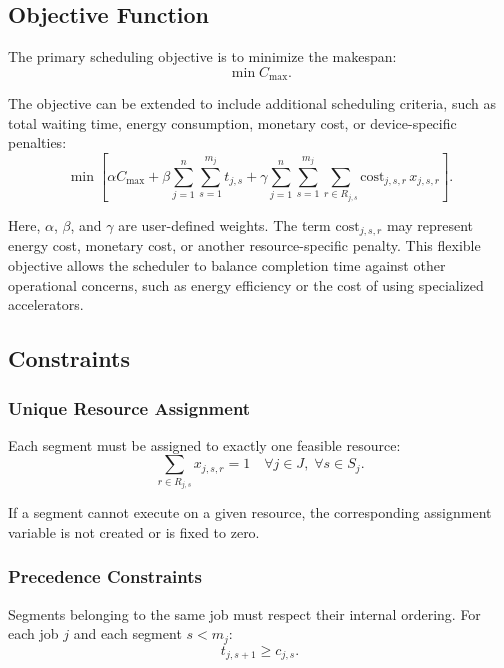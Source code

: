 \documentclass[conference]{IEEEtran}
\begin{document}
\subsection{Objective Function}
The primary scheduling objective is to minimize the makespan:
\begin{equation}
\min C_{\max}.
\end{equation}

The objective can be extended to include additional scheduling criteria, such as
total waiting time, energy consumption, monetary cost, or device-specific
penalties:
\begin{equation}
\min \left[
\alpha C_{\max}
+ \beta \sum_{j=1}^{n} \sum_{s=1}^{m_j} t_{j,s}
+ \gamma \sum_{j=1}^{n} \sum_{s=1}^{m_j}
\sum_{r \in R_{j,s}}
\mathrm{cost}_{j,s,r}\, x_{j,s,r}
\right].
\end{equation}

Here, \(\alpha\), \(\beta\), and \(\gamma\) are user-defined weights. The term
\(\mathrm{cost}_{j,s,r}\) may represent energy cost, monetary cost, or another
resource-specific penalty. This flexible objective allows the scheduler to
balance completion time against other operational concerns, such as energy
efficiency or the cost of using specialized accelerators.

\subsection{Constraints}

\subsubsection{Unique Resource Assignment}
Each segment must be assigned to exactly one feasible resource:
\begin{equation}
\sum_{r \in R_{j,s}} x_{j,s,r} = 1
\quad
\forall j \in J,\; \forall s \in S_j.
\end{equation}

If a segment cannot execute on a given resource, the corresponding assignment
variable is not created or is fixed to zero.

\subsubsection{Precedence Constraints}
Segments belonging to the same job must respect their internal ordering. For
each job \(j\) and each segment \(s < m_j\):
\begin{equation}
t_{j,s+1} \geq c_{j,s}.
\end{equation}
\end{document}
